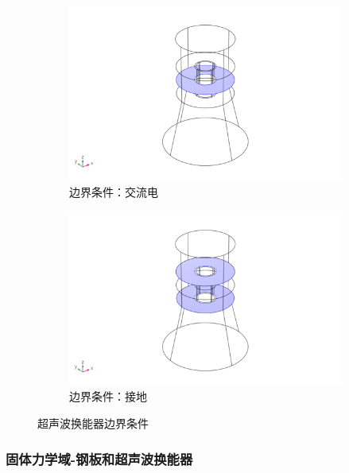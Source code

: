 \documentclass[fontset=windows,12pt,a4paper,titlepage,UTF8]{ctexart}
\begin{document}
\begin{figure}[h]
  \centering
  \begin{subfigure}{0.4\textwidth}
    \centering
    \includegraphics[width=\textwidth]{assets/ultrasonic_transducer_boundry_condition_v1.png}
    \caption{边界条件：交流电}
    \label{pic:边界条件：交流电}
  \end{subfigure}
  \hfill
  \begin{subfigure}{0.4\textwidth}
    \centering
    \includegraphics[width=\textwidth]{assets/ultrasonic_transducer_boundry_condition_v0.png}
    \caption{边界条件：接地}
    \label{pic:边界条件：接地}
  \end{subfigure}
  \caption{超声波换能器边界条件}
\end{figure}

\subsubsection{固体力学域-钢板和超声波换能器}
\end{document}
